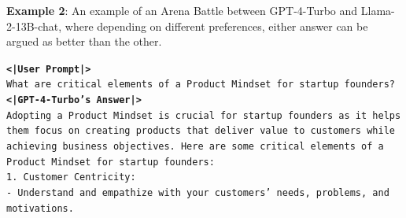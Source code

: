 \documentclass{article}
\begin{document}
\textbf{Example 2}: An example of an Arena Battle between GPT-4-Turbo and Llama-2-13B-chat, where depending on different preferences, either answer can be argued as better than the other.
\begin{tcolorbox}
\texttt{\textbf{<|User Prompt|>} \\
What are critical elements of a Product Mindset for startup founders?} \\

\texttt{\textbf{<|GPT-4-Turbo's Answer|>} \\
Adopting a Product Mindset is crucial for startup founders as it helps them focus on creating products that deliver value to customers while achieving business objectives. Here are some critical elements of a Product Mindset for startup founders:} \\

\texttt{1. Customer Centricity: \\
   - Understand and empathize with your customers’ needs, problems, and motivations.}
\end{tcolorbox}
\end{document}

